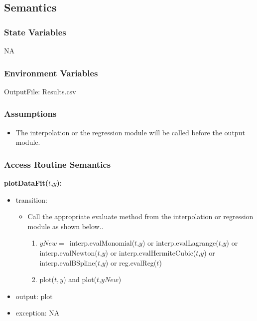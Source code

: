 \documentclass[12pt, titlepage]{article}
\begin{document}
\subsection{Semantics}

\subsubsection{State Variables}
NA


\subsubsection{Environment Variables}


OutputFile: Results.csv

\subsubsection{Assumptions}

\begin{itemize}
	
	\item The interpolation or the regression module will be called before the 
	output module.
	
\end{itemize}
\subsubsection{Access Routine Semantics}



\noindent \textbf{plotDataFit($t$,$y$):}
\begin{itemize}
	\item transition: 
	\begin{itemize}
		\item Call the appropriate evaluate method from the interpolation or 
		regression module as shown below..
		
		\begin{enumerate}
			
			\item $yNew = $\ interp.evalMonomial($t$,$y$) or
			interp.evalLagrange($t$,$y$) or
			interp.evalNewton($t$,$y$) or
			interp.evalHermiteCubic($t$,$y$) or
			interp.evalBSpline($t$,$y$) or
			reg.evalReg($t$)
			
			\item plot($t,y$) and plot($t$,$yNew$)
\end{enumerate}	
	\end{itemize}

	\item output:  plot
	
	\item exception: NA
\end{itemize}
\end{document}
